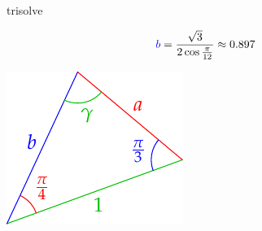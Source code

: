 \begin{examples}{}{trisolve}
\begin{enumerate}
\begin{minipage}[t]{0.75\linewidth}
\begin{align*}
		  	&\textcolor{blue}{b}=\frac{\sqrt 3}{2\cos\frac{\pi}{12}}\approx 0.897
		  \end{align*}
		\end{minipage}\hfill\begin{minipage}[t]{0.24\linewidth}\vspace{0pt}
			\flushright\includegraphics[scale=0.95]{angles-asasolve}
		\end{minipage}
	\end{enumerate}
\end{examples}


\goodbreak



